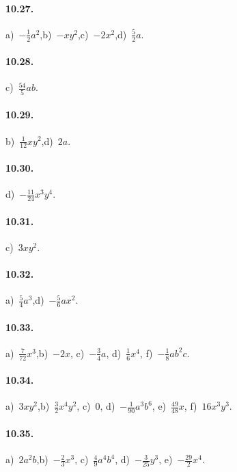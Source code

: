 \paragraph{10.27.} a)~$-\frac{1}{2}a^{2}$,\quad b)~$-xy^{2}$,\quad c)~$-2x^{2}$,\quad d)~$\frac{5}{2}a$.

\paragraph{10.28.} c)~$\frac{54}{5}ab$.

\paragraph{10.29.} b)~$\frac{1}{12}xy^{2}$,\quad d)~$2a$.

\paragraph{10.30.} d)~$-\frac{11}{24}x^{3}y^{4}$.

\paragraph{10.31.} c)~$3xy^{2}$.

\paragraph{10.32.} a)~$\frac{5}{4}a^{3}$,\quad d)~$-\frac{5}{6}ax^{2}$.

\paragraph{10.33.} a)~$\frac{7}{72}x^{3}$,\quad b)~$-2x$, \quad c)~$-\frac{3}{4}a$, \quad d)~$\frac{1}{6}x^{4}$, \quad f)~$-\frac{1}{8}ab^{2}c$.

\paragraph{10.34.} a)~$3xy^{2}$,\quad b)~$\frac{3}{2}x^{4}y^{2}$, \quad c)~0, \quad d)~$-\frac{1}{90}a^{3}b^{6}$, \quad e)~$\frac{49}{48}x$, \quad f)~$16x^{3}y^{3}$.

\paragraph{10.35.} a)~$2a^{2}b$,\quad b)~$-\frac{2}{3}x^{3}$, \quad c)~$\frac{4}{9}a^{4}b^{4}$, \quad d)~$-\frac{3}{25}y^{3}$, \quad e)~$-\frac{29}{2}x^{4}$.

